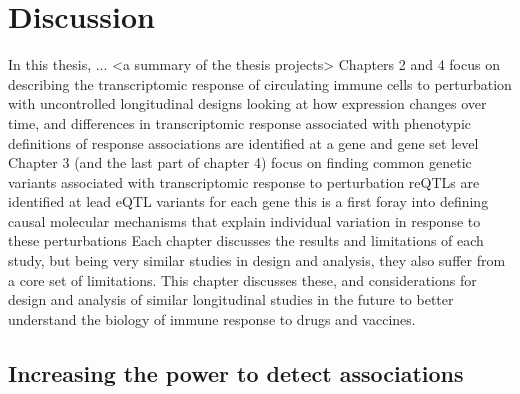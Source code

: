 %
%

\chapter{Discussion}
\label{ch:discussion}

\begin{outline}

\1 In this thesis, ... <a summary of the thesis projects>
    \2 Chapters 2 and 4 focus on describing the transcriptomic response of circulating immune cells to perturbation with uncontrolled longitudinal designs
        \3 looking at how expression changes over time, and differences in transcriptomic response associated with phenotypic definitions of response
        \3 associations are identified at a gene and gene set level
    \2 Chapter 3 (and the last part of chapter 4) focus on finding common genetic variants associated with transcriptomic response to perturbation
        \3 reQTLs are identified at lead eQTL variants for each gene
        \3 this is a first foray into defining causal molecular mechanisms that explain individual variation in response to these perturbations
    \2 Each chapter discusses the results and limitations of each study, but being very similar studies in design and analysis, they also suffer from a core set of limitations.
    \2 This chapter discusses these, and considerations for design and analysis of similar longitudinal studies in the future to better understand the biology of immune response to drugs and vaccines.

\section{Increasing the power to detect associations}


\end{outline}
